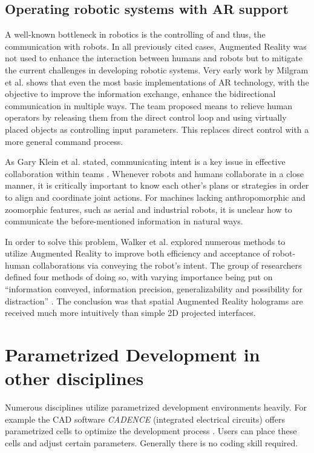 \subsection{Operating robotic systems with AR support}
A well-known bottleneck in robotics is the controlling of and thus, the communication with robots. In all previously cited cases, Augmented Reality was not used to enhance the interaction between humans and robots but to mitigate the current challenges in developing robotic systems. Very early work by Milgram et al. \cite{milgram1993applications} shows that even the most basic implementations of AR technology, with the objective to improve the information exchange, enhance the bidirectional communication in multiple ways. The team proposed means to relieve human operators by releasing them from the direct control loop and using virtually placed objects as controlling input parameters. This replaces direct control with a more general command process.

As Gary Klein et al. stated, communicating intent is a key issue in effective collaboration within teams \cite{klein2005common}. Whenever robots and humans collaborate in a close manner, it is critically important to know each other’s plans or strategies in order to align and coordinate joint actions. For machines lacking anthropomorphic and zoomorphic features, such as aerial and industrial robots, it is unclear how to communicate the before-mentioned information in natural ways.

In order to solve this problem, Walker et al. \cite{walker2018communicating} explored numerous methods to utilize Augmented Reality to improve both efficiency and acceptance of robot-human collaborations via conveying the robot's intent. The group of researchers defined four methods of doing so, with varying importance being put on “information conveyed, information precision, generalizability and possibility for distraction” \cite{walker2018communicating}. The conclusion was that spatial Augmented Reality holograms are received much more intuitively than simple 2D projected interfaces.

\section{Parametrized Development in other disciplines}
Numerous disciplines utilize parametrized development environments heavily. For example the CAD software \textit{CADENCE} (integrated electrical circuits) offers parametrized cells to optimize the development process \cite{parametrizedCellElectricalInductor}. Users can place these cells and adjust certain parameters. Generally there is no coding skill required.

